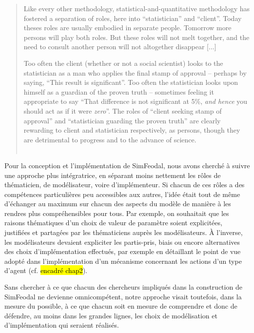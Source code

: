 \begin{quotation}
	\noindent \og Like every other methodology, statistical-and-quantitative methodology has fostered a separation of roles, here into “statistician” and “client”. Today theses roles are usually embodied in separate people. Tomorrow more persons will play both roles. But these roles will not melt together, and the need to consult another person will not altogether disappear [...]
	
	Too often the client (whether or not a social scientist) looks to the statistician as a man who applies the final stamp of approval -- perhaps by saying, “This result is significant”. Too often the statistician looks upon himself as a guardian of the proven truth -- sometimes feeling it appropriate to say “That difference is not significant at 5\%, \textit{and hence} you should act as if it were \textit{zero}”. The roles of “client seeking stamp of approval” and “statistician guarding the proven truth” are clearly rewarding to client and statistician respectively, as persons, though they are detrimental to progress and to the advance of science.\fg{} \\
	\mbox{}~ \hfill \cite[145]{jones_statistical_1986}
\end{quotation}

Pour la conception et l'implémentation de SimFeodal, nous avons cherché à suivre une approche plus intégratrice, en séparant moins nettement les rôles de thématicien, de modélisateur, voire d'\og{}implémenteur\fg{}.
Si chacun de ces rôles a des compétences particulières peu accessibles aux autres, l'idée était tout de même d'échanger au maximum sur chacun des aspects du modèle de manière à les rendres plus compréhensibles pour tous.
Par exemple, on souhaitait que les raisons thématiques d'un choix de valeur de paramètre soient explicitées, justifiées et partagées par les thématiciens auprès les modélisateurs.
À l'inverse, les modélisateurs devaient expliciter les partis-pris, biais ou encore alternatives des choix d'implémentation effectués, par exemple en détaillant le point de vue adopté dans l'implémentation d'un mécanisme concernant les actions d'un type d'agent (cf. \hl{encadré chap2}).

Sans chercher à ce que chacun des chercheurs impliqués dans la construction de SimFeodal ne devienne omnicompétent, notre approche visait toutefois, dans la mesure du possible, à ce que chacun soit en mesure de comprendre et donc de défendre, au moins dans les grandes lignes, les choix de modélisation et d'implémentation qui seraient réalisés.

